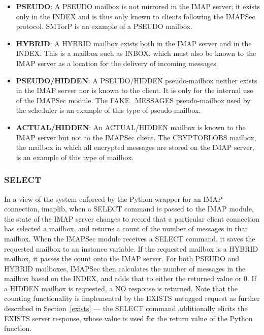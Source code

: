 \documentclass[pageno]{jpaper}
\newcommand{\project}{IMAPSec }
\begin{document}
\begin{itemize}

\item \textbf{PSEUDO}: A PSEUDO mailbox is not mirrored in the IMAP server; it exists only in the INDEX and is thus only known to clients following the \project protocol. SMTorP is an example of a PSEUDO mailbox.
\item \textbf{HYBRID}: A HYBRID mailbox exists both in the IMAP server and in the INDEX. This is a mailbox such as INBOX, which must also be known to the IMAP server as a location for the delivery of incoming messages.
\item \textbf{PSEUDO/HIDDEN}: A PSEUDO/HIDDEN pseudo-mailbox neither exists in the IMAP server nor is known to the client. It is only for the internal use of the \project module. The FAKE\_MESSAGES pseudo-mailbox used by the scheduler is an example of this type of pseudo-mailbox.
\item \textbf{ACTUAL/HIDDEN}: An ACTUAL/HIDDEN mailbox is known to the IMAP server but not to the \project client. The CRYPTOBLOBS mailbox, the mailbox in which all encrypted messages are stored on the IMAP server, is an example of this type of mailbox.

\end{itemize}


\subsubsection{SELECT}
\label{select}

In a view of the system enforced by the Python wrapper for an IMAP connection, imaplib, when a SELECT command is passed to the IMAP module, the state of the IMAP server changes to record that a particular client connection has selected a mailbox, and returns a count of the number of messages in that mailbox. When the \project module receives a SELECT command, it saves the requested mailbox to an instance variable. If the requested mailbox is a HYBRID mailbox, it passes the count onto the IMAP server. For both PSEUDO and HYBRID mailboxes, \project then calculates the number of messages in the mailbox based on the INDEX, and adds that to either the returned value or 0. If a HIDDEN mailbox is requested, a NO response is returned. Note that the counting functionality is implemented by the EXISTS untagged request as further described in Section~\ref{exists} \---- the SELECT command additionally elicits the EXISTS server response, whose value is used for the return value of the Python function.
\end{document}
